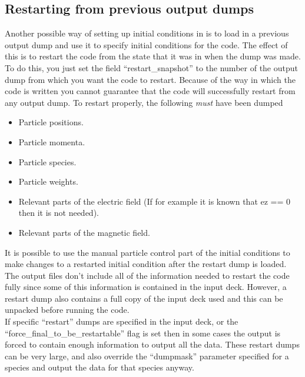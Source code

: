 \subsection{Restarting {\EPOCH} from previous output dumps}
Another possible way of setting up initial conditions in {\EPOCH} is to load in
a previous output dump and use it to specify initial conditions for the
code. The effect of this is to restart the code from the state that it was in
when the dump was made. To do this, you just
set the field ``restart\_snapshot'' to
the number of the output dump from which you want the code to restart. Because
of the way in which the code is written you cannot guarantee that the code will
successfully restart from any output dump. To restart properly, the
following {\it must} have been dumped
\begin{itemize}
\item Particle positions.
\item Particle momenta.
\item Particle species.
\item Particle weights.
\item Relevant parts of the electric field (If for example it is known that
  ez == 0 then it is not needed).
\item Relevant parts of the magnetic field.
\end{itemize}
It is possible to use the manual particle control part of the
initial conditions to make changes to a restarted initial condition after the
restart dump is loaded. The output files don't include all of the information
needed to restart the code fully since some of this information is contained
in the input deck. However, a restart dump also contains a full copy
of the input deck used and this can be unpacked before running the
code.\\

If specific ``restart'' dumps are specified in the input deck, or the
``force\_final\_to\_be\_restartable'' flag is set then in some cases the
output is forced to contain enough information to output all the data. These
restart dumps can be very large, and also override the ``dumpmask'' parameter
specified for a species and output the data for that species anyway.

